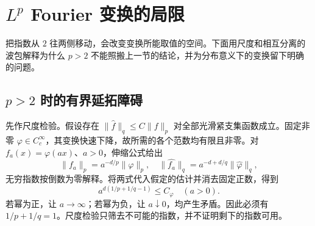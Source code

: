 \section{\texorpdfstring{\(L^p\)}{Lᵖ} Fourier 变换的局限}
\label{b2:sec:0403}

把指数从 \(2\) 往两侧移动，会改变变换所能取值的空间。下面用尺度和相互分离的波包解释为什么 \(p>2\) 不能照搬上一节的结论，并为分布意义下的变换留下明确的问题。

\subsection{\texorpdfstring{\(p>2\)}{p>2} 时的有界延拓障碍}
\label{b2:subsec:040301}

先作尺度检验。假设存在 \(\|\widehat f\|_q\leq C\|f\|_p\) 对全部光滑紧支集函数成立。固定非零 \(\varphi\in C_c^\infty\)，其变换快速下降，故所需的各个范数均有限且非零。对 \(f_a(x)=\varphi(ax)\)、\(a>0\)，伸缩公式给出
\[
 \|f_a\|_p=a^{-d/p}\|\varphi\|_p,
 \quad\|\widehat {f_a}\|_q=a^{-d+d/q}\|\widehat\varphi\|_q,
\]
无穷指数按倒数为零解释。将两式代入假定的估计并消去固定正数，得到
\[
 a^{d(1/p+1/q-1)}\leq C_\varphi\quad(a>0).
\]
若幂为正，让 \(a\to\infty\)；若幂为负，让 \(a\downarrow0\)，均产生矛盾。因此必须有 \(1/p+1/q=1\)。尺度检验只筛去不可能的指数，并不证明剩下的指数可用。

